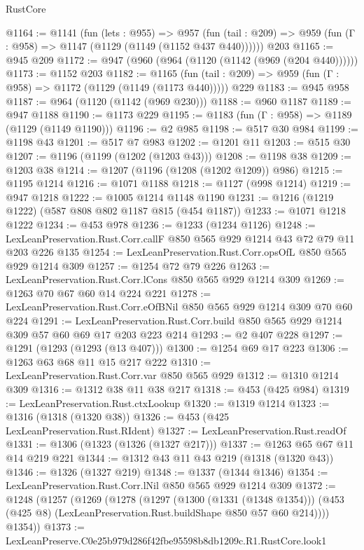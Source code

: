 \begin{lexlean}{RustCore}
\begin{coremodule}
@1164 := @1141
    (fun (lets : @955) =>
    @957 (fun (tail : @209) => @959 (fun (Γ : @958) => @1147 (@1129 (@1149 (@1152 @437 @440))))))
    @203
@1165 := @945 @209
@1172 := @947 (@960 (@964 (@1120 (@1142 (@969 (@204 @440))))))
@1173 := @1152 @203
@1182 := @1165
    (fun (tail : @209) => @959 (fun (Γ : @958) => @1172 (@1129 (@1149 (@1173 @440)))))
    @229
@1183 := @945 @958
@1187 := @964 (@1120 (@1142 (@969 @230)))
@1188 := @960 @1187
@1189 := @947 @1188
@1190 := @1173 @229
@1195 := @1183 (fun (Γ : @958) => @1189 (@1129 (@1149 @1190)))
@1196 := @2 @985
@1198 := @517 @30 @984
@1199 := @1198 @43
@1201 := @517 @7 @983
@1202 := @1201 @11
@1203 := @515 @30
@1207 := @1196 (@1199 (@1202 (@1203 @43)))
@1208 := @1198 @38
@1209 := @1203 @38
@1214 := @1207 (@1196 (@1208 (@1202 @1209)) @986)
@1215 := @1195 @1214
@1216 := @1071 @1188
@1218 := @1127 (@998 @1214)
@1219 := @947 @1218
@1222 := @1005 @1214 @1148 @1190
@1231 := @1216 (@1219 @1222) (@587 @808 @802 @1187 @815 (@454 @1187))
@1233 := @1071 @1218 @1222
@1234 := @453 @978
@1236 := @1233 (@1234 @1126)
@1248 := LexLeanPreservation.Rust.Corr.callF @850 @565 @929 @1214 @43 @72 @79 @11 @203 @226 @135
@1254 := LexLeanPreservation.Rust.Corr.opsOfL @850 @565 @929 @1214 @309
@1257 := @1254 @72 @79 @226
@1263 := LexLeanPreservation.Rust.Corr.lCons @850 @565 @929 @1214 @309
@1269 := @1263 @70 @67 @60 @14 @224 @221
@1278 := LexLeanPreservation.Rust.Corr.eOfBNil @850 @565 @929 @1214 @309 @70 @60 @224
@1291 := LexLeanPreservation.Rust.Corr.build
    @850
    @565
    @929
    @1214
    @309
    @57
    @60
    @69
    @17
    @203
    @223
    @214
@1293 := @2 @407 @228
@1297 := @1291 (@1293 (@1293 (@13 @407)))
@1300 := @1254 @69 @17 @223
@1306 := @1263 @63 @68 @11 @15 @217 @222
@1310 := LexLeanPreservation.Rust.Corr.var @850 @565 @929
@1312 := @1310 @1214 @309
@1316 := @1312 @38 @11 @38 @217
@1318 := @453 (@425 @984)
@1319 := LexLeanPreservation.Rust.ctxLookup
@1320 := @1319 @1214
@1323 := @1316 (@1318 (@1320 @38))
@1326 := @453 (@425 LexLeanPreservation.Rust.RIdent)
@1327 := LexLeanPreservation.Rust.readOf
@1331 := @1306 (@1323 (@1326 (@1327 @217)))
@1337 := @1263 @65 @67 @11 @14 @219 @221
@1344 := @1312 @43 @11 @43 @219 (@1318 (@1320 @43))
@1346 := @1326 (@1327 @219)
@1348 := @1337 (@1344 @1346)
@1354 := LexLeanPreservation.Rust.Corr.lNil @850 @565 @929 @1214 @309
@1372 := @1248
    (@1257
      (@1269
        (@1278
          (@1297
            (@1300 (@1331 (@1348 @1354)))
            (@453 (@425 @8) (LexLeanPreservation.Rust.buildShape @850 @57 @60 @214))))
        @1354))
@1373 := LexLeanPreserve.C0e25b979d286f42fbe95598b8db1209c.R1.RustCore.look1

\end{coremodule}
\end{lexlean}
